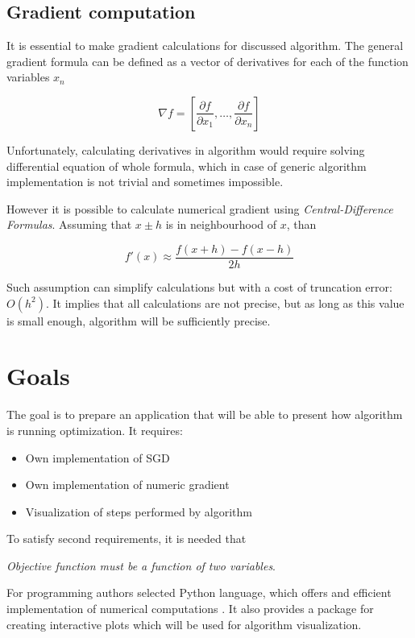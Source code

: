 \documentclass[11pt,a4paper]{IEEEtran}
\begin{document}
\subsection{Gradient computation}

It is essential to make gradient calculations for discussed algorithm. The general gradient formula can be defined as a vector of derivatives for each of the function variables $x_n$

$$ \nabla f = \left[\frac{\partial f}{\partial x_1}, \dots, \frac{\partial f}{\partial x_n}\right] $$

Unfortunately, calculating derivatives in algorithm would require solving differential equation of whole formula, which in case of generic algorithm implementation is not trivial and sometimes impossible.

However it is possible to calculate numerical gradient using \textit{Central-Difference Formulas}\cite{Mathews:1998}. Assuming that $x \pm h$ is in neighbourhood of $x$, than

$$ f'(x) \approx \frac{f(x+h)-f(x-h)}{2h} $$

Such assumption can simplify calculations but with a cost of truncation error: $O(h^2)$. It implies that all calculations are not precise, but as long as this value is small enough, algorithm will be sufficiently precise.

\section{Goals}
The goal is to prepare an application that will be able to present how algorithm is running optimization. It requires:
\begin{itemize}
\item Own implementation of SGD
\item Own implementation of numeric gradient
\item Visualization of steps performed by algorithm
\end{itemize}
To satisfy second requirements, it is needed that

\textit{Objective function must be a function of two variables}.

For programming authors selected Python language, which offers and efficient implementation of numerical computations \cite{oliphant_guide_2006}. It also provides a package for creating interactive plots \cite{Hunter:2007} which will be used for algorithm visualization.
\end{document}
